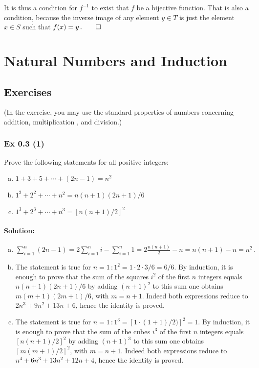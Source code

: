 {{It is thus a  condition for $f^{-1}$ to exist that $f$ be a bijective function.
That is also a  condition, because the inverse image of any element $y \in T$ is 
just the  element $x \in S$ such that $f(x) = y\,.\qed$
}


\section{Natural Numbers and Induction}\label{sec:0.3}	
\subsection*{Exercises}\label{sec:0.3_Exercises}
(In the exercise, you may use the standard properties of numbers concerning addition, multiplication , and division.)

\subsubsection{Ex 0.3 (1)}\label{sec:Ex_0.3.1}
Prove the following statements for all positive integers:
\begin{enumerate}[(a)]
\item $1 + 3 + 5 + \cdots + (2n - 1) = n^2$
\item $1^2 + 2^2 + \cdots + n^2 = n (n+1)(2n + 1)/6$
\item $1^3 + 2^3 + \cdots + n^3 = [n (n+1)/2]^2$
\end{enumerate}

%
%
\paragraph{Solution:}{
\begin{enumerate}[(a)]
\item $\sum_{i=1}^{n} (2n-1) = 2 \sum_{i=1}^{n} i - \sum_{i=1}^{n} 1 = 2 \frac{n(n+1)}{2} - n = n(n+1) - n = n^2\,.$ 
\item The statement is true for $n = 1\,: 1^2 = 1 \cdot 2 \cdot 3/6 = 6/6$. By induction, it is enough to prove that  the sum of the squares $i^2$ of the first $n$ integers equals $n (n+1)(2n + 1)/6$  by adding $(n+1)^2$ to this sum one obtains $m (m+1)(2m + 1)/6$, with $m=n+1$. Indeed both expressions reduce to $2 n^3 + 9 n^2 + 13 n + 6$, hence the identity is proved.
\item The statement is true for $n = 1\,: 1^3 = [1\cdot(1+1)/2)]^2 = 1$. By induction, it is enough to prove that  the sum of the cubes $i^3$ of the first $n$ integers equals $[n (n+1)/2]^2$  by adding $(n+1)^3$ to this sum one obtains $[m (m+1)/2]^2$, with $m=n+1$. Indeed both expressions reduce to $n^4+ 6 n^3 + 13 n^2 + 12 n + 4$, hence the identity is proved.
\end{enumerate}
}

}
